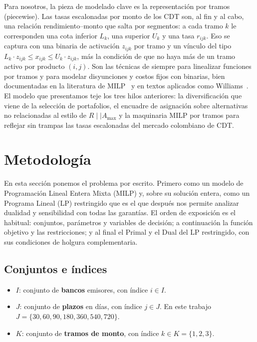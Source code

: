 \documentclass[11pt,a4paper]{article}
\begin{document}
Para nosotros, la pieza de modelado clave es la representación por tramos (piecewise). Las
tasas escalonadas por monto de los CDT son, al fin y al cabo, una relación rendimiento--monto
que salta por segmentos: a cada tramo $k$ le corresponden una cota inferior $L_k$, una superior
$U_k$ y una tasa $r_{ijk}$. Eso se captura con una binaria de activación $z_{ijk}$ por tramo y
un vínculo del tipo $L_k \cdot z_{ijk} \le x_{ijk} \le U_k \cdot z_{ijk}$, más la condición de
que no haya más de un tramo activo por producto $(i, j)$. Son las técnicas de siempre para
linealizar funciones por tramos y para modelar disyunciones y costos fijos con binarias, bien
documentadas en la literatura de MILP~\citep{wolsey1998, nemhauser1988} y en textos aplicados como Williams~\citep{williams2013}. El
modelo que presentamos teje los tres hilos anteriores: la diversificación que viene de la
selección de portafolios, el encuadre de asignación sobre alternativas no relacionadas al estilo
de $R \mid\mid A_{\max}$ y la maquinaria MILP por tramos para reflejar sin trampas las tasas
escalonadas del mercado colombiano de CDT.

\section{Metodología}

En esta sección ponemos el problema por escrito. Primero como un modelo de Programación
Lineal Entera Mixta (MILP) y, sobre su solución entera, como un Programa Lineal (LP)
restringido que es el que después nos permite analizar dualidad y sensibilidad con todas las
garantías. El orden de exposición es el habitual: conjuntos, parámetros y variables de
decisión; a continuación la función objetivo y las restricciones; y al final el Primal y el
Dual del LP restringido, con sus condiciones de holgura complementaria.

\subsection{Conjuntos e índices}

\begin{itemize}
  \item $I$: conjunto de \textbf{bancos} emisores, con índice $i \in I$.
  \item $J$: conjunto de \textbf{plazos} en días, con índice $j \in J$. En este trabajo $J = \{30, 60, 90, 180, 360, 540, 720\}$.
  \item $K$: conjunto de \textbf{tramos de monto}, con índice $k \in K = \{1, 2, 3\}$.
\end{itemize}
\end{document}
